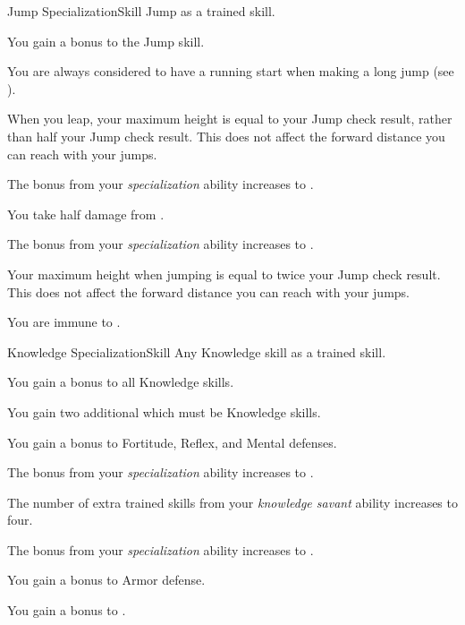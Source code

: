     \begin{feat}{Jump Specialization}{Skill}
        \featpre Jump as a trained skill.

         You gain a  bonus to the Jump skill.

         You are always considered to have a running start when making a long jump (see ).

         When you leap, your maximum height is equal to your Jump check result, rather than half your Jump check result.
        This does not affect the forward distance you can reach with your jumps.

         The bonus from your \textit{specialization} ability increases to .

         You take half damage from .

         The bonus from your \textit{specialization} ability increases to .

         Your maximum height when jumping is equal to twice your Jump check result.
        This does not affect the forward distance you can reach with your jumps.

         You are immune to .
    \end{feat}

    \begin{feat}{Knowledge Specialization}{Skill}
        \featpre Any Knowledge skill as a trained skill.

         You gain a  bonus to all Knowledge skills.

         You gain two additional  which must be Knowledge skills.

         You gain a  bonus to Fortitude, Reflex, and Mental defenses. 

         The bonus from your \textit{specialization} ability increases to .

         The number of extra trained skills from your \textit{knowledge savant} ability increases to four.

         The bonus from your \textit{specialization} ability increases to .

         You gain a  bonus to Armor defense.

         You gain a  bonus to .
    \end{feat}

